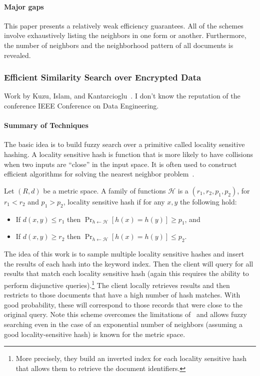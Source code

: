 \paragraph{Major gaps}
This paper presents a relatively weak efficiency guarantees.  All of the schemes involve exhaustively listing the neighbors in one form or another.  Furthermore, the number of neighbors and the neighborhood pattern of all documents is revealed.

\subsubsection{Efficient Similarity Search over Encrypted Data}
Work by Kuzu, Islam, and Kantarcioglu~\cite{kuzu2012efficient}.  I don't know the reputation of the conference IEEE Conference on Data Engineering.  

\paragraph{Summary of Techniques} The basic idea is to build fuzzy search over a primitive called locality sensitive hashing.  A locality sensitive hash is function that is more likely to have collisions when two inputs are ``close'' in the input space.  It is often used to construct efficient algorithms for solving the nearest neighbor problem~\cite{datar2004locality,slaney2008locality}.  

\begin{definition}
Let $(R,d)$ be a metric space.  A family of functions $\mathcal{H}$ is a $(r_1, r_2, p_1, p_2)$, for $r_1< r_2$ and $p_1 >p_2$, locality sensitive hash if for any $x, y$ the following hold:
\begin{itemize}
\item If $d(x, y) \le r_1$ then $\Pr_{h\leftarrow \mathcal{H}}[h(x) = h(y)] \ge p_1$, and 
\item If $d(x, y) \ge r_2$ then $\Pr_{h\leftarrow \mathcal{H}}[h(x) = h(y)] \le p_2$.
\end{itemize}
\end{definition}

The idea of this work is to sample multiple locality sensitive hashes and insert the results of each hash into the keyword index.  Then the client will query for all results that match each locality sensitive hash (again this requires the ability to perform disjunctive queries).\footnote{More precisely, they build an inverted index for each locality sensitive hash that allows them to retrieve the document identifiers.}  The client locally retrieves results and then restricts to those documents that have a high number of hash matches.  With good probability, these will correspond to those records that were close to the original query.  Note this scheme overcomes the limitations of~\cite{li2010fuzzy} and allows fuzzy searching even in the case of an exponential number of neighbors (assuming a good locality-sensitive hash) is known for the metric space.

